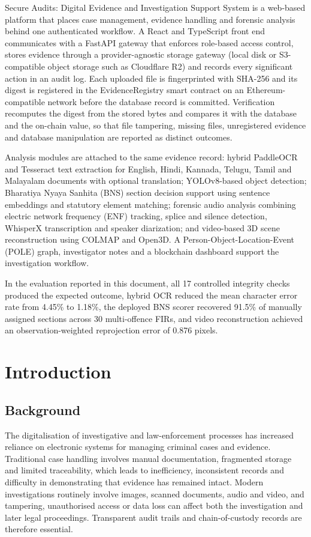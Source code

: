 \documentclass[12pt,a4paper,oneside]{report}
\begin{document}
Secure Audits: Digital Evidence and Investigation Support System is a web-based platform that places case management, evidence handling and forensic analysis behind one authenticated workflow. A React and TypeScript front end communicates with a FastAPI gateway that enforces role-based access control, stores evidence through a provider-agnostic storage gateway (local disk or S3-compatible object storage such as Cloudflare R2) and records every significant action in an audit log. Each uploaded file is fingerprinted with SHA-256 and its digest is registered in the EvidenceRegistry smart contract on an Ethereum-compatible network before the database record is committed. Verification recomputes the digest from the stored bytes and compares it with the database and the on-chain value, so that file tampering, missing files, unregistered evidence and database manipulation are reported as distinct outcomes.

Analysis modules are attached to the same evidence record: hybrid PaddleOCR and Tesseract text extraction for English, Hindi, Kannada, Telugu, Tamil and Malayalam documents with optional translation; YOLOv8-based object detection; Bharatiya Nyaya Sanhita (BNS) section decision support using sentence embeddings and statutory element matching; forensic audio analysis combining electric network frequency (ENF) tracking, splice and silence detection, WhisperX transcription and speaker diarization; and video-based 3D scene reconstruction using COLMAP and Open3D. A Person-Object-Location-Event (POLE) graph, investigator notes and a blockchain dashboard support the investigation workflow.

In the evaluation reported in this document, all 17 controlled integrity checks produced the expected outcome, hybrid OCR reduced the mean character error rate from 4.45\% to 1.18\%, the deployed BNS scorer recovered 91.5\% of manually assigned sections across 30 multi-offence FIRs, and video reconstruction achieved an observation-weighted reprojection error of 0.876 pixels.
\clearpage
\tableofcontents
\clearpage
\listoffigures
\clearpage
\listoftables
\clearpage
{}
\setcounter{page}{1}
\chapter{Introduction}
\section{Background}
The digitalisation of investigative and law-enforcement processes has increased reliance on electronic systems for managing criminal cases and evidence. Traditional case handling involves manual documentation, fragmented storage and limited traceability, which leads to inefficiency, inconsistent records and difficulty in demonstrating that evidence has remained intact. Modern investigations routinely involve images, scanned documents, audio and video, and tampering, unauthorised access or data loss can affect both the investigation and later legal proceedings. Transparent audit trails and chain-of-custody records are therefore essential.
\end{document}
